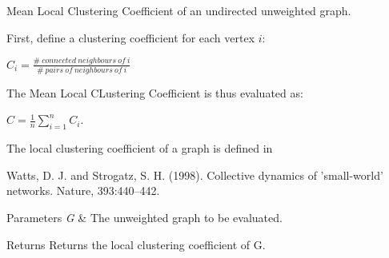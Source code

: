 Mean Local Clustering Coefficient of an undirected unweighted graph. 

First, define a clustering coefficient for each vertex $i$\+:

$C_i = \frac{\# \ connected \ neighbours \ of \ i}{\# \ pairs \ of \ neighbours \ of \ i}$

The Mean Local C\+Lustering Coefficient is thus evaluated as\+:

$C = \frac{1}{n} \sum_{i=1}^n C_i$.

The local clustering coefficient of a graph is defined in \begin{DoxyVerb}Watts, D. J. and Strogatz, S. H. (1998). Collective
dynamics of ’small-world’ networks. Nature, 393:440–442.
\end{DoxyVerb}



\begin{DoxyParams}{Parameters}
{\em G} & The unweighted graph to be evaluated. \\
\hline
\end{DoxyParams}
\begin{DoxyReturn}{Returns}
Returns the local clustering coefficient of G. 
\end{DoxyReturn}
